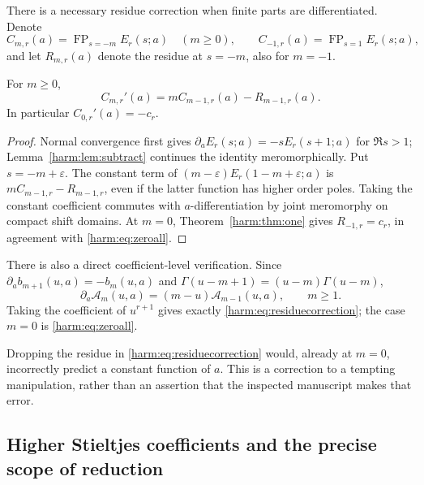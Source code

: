 There is a necessary residue correction when finite parts are
differentiated.  Denote
\[
 C_{m,r}(a)=\operatorname{FP}_{s=-m}E_r(s;a)\quad(m\geq0),
 \qquad C_{-1,r}(a)=\operatorname{FP}_{s=1}E_r(s;a),
\]
and let $R_{m,r}(a)$ denote the residue at $s=-m$, also for $m=-1$.

\begin{corollary}
\label{harm:cor:residue}
For $m\geq0$,
\begin{equation}\label{harm:eq:residuecorrection}
 C_{m,r}'(a)=mC_{m-1,r}(a)-R_{m-1,r}(a).
\end{equation}
In particular $C_{0,r}'(a)=-c_r$.
\end{corollary}
\begin{proof}
Normal convergence first gives
$\partial_a E_r(s;a)=-sE_r(s+1;a)$ for $\Re s>1$;
Lemma~\ref{harm:lem:subtract} continues the identity meromorphically.
Put $s=-m+\varepsilon$.  The constant term of
$(m-\varepsilon)E_r(1-m+\varepsilon;a)$ is
$mC_{m-1,r}-R_{m-1,r}$, even if the latter function has higher
order poles.  Taking the constant coefficient commutes with
$a$-differentiation by joint meromorphy on compact shift domains.
At $m=0$, Theorem~\ref{harm:thm:one} gives $R_{-1,r}=c_r$,
in agreement with \eqref{harm:eq:zeroall}.
\end{proof}

There is also a direct coefficient-level verification.  Since
$\partial_a b_{m+1}(u,a)=-b_m(u,a)$ and
$\Gamma(u-m+1)=(u-m)\Gamma(u-m)$,
\[
 \partial_a\mathcal A_m(u,a)=(m-u)\mathcal A_{m-1}(u,a),
 \qquad m\geq1.
\]
Taking the coefficient of $u^{r+1}$ gives exactly
\eqref{harm:eq:residuecorrection}; the case $m=0$ is
\eqref{harm:eq:zeroall}.

Dropping the residue in \eqref{harm:eq:residuecorrection} would,
already at $m=0$, incorrectly predict a constant function of $a$.
This is a correction to a tempting manipulation, rather than an
assertion that the inspected manuscript makes that error.

\subsection{Higher Stieltjes coefficients and the precise scope of reduction}

